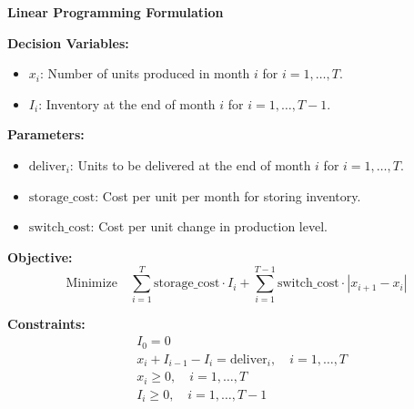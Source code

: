 \documentclass{article}
\begin{document}
\textbf{Linear Programming Formulation}

\textbf{Decision Variables:}
\begin{itemize}
    \item $x_i$: Number of units produced in month $i$ for $i = 1, \ldots, T$.
    \item $I_i$: Inventory at the end of month $i$ for $i = 1, \ldots, T-1$.
\end{itemize}

\textbf{Parameters:}
\begin{itemize}
    \item $\text{deliver}_i$: Units to be delivered at the end of month $i$ for $i = 1, \ldots, T$.
    \item $\text{storage\_cost}$: Cost per unit per month for storing inventory.
    \item $\text{switch\_cost}$: Cost per unit change in production level.
\end{itemize}

\textbf{Objective:}
\begin{equation}
\text{Minimize} \quad \sum_{i=1}^{T} \text{storage\_cost} \cdot I_i + \sum_{i=1}^{T-1} \text{switch\_cost} \cdot |x_{i+1} - x_i|
\end{equation}

\textbf{Constraints:}
\begin{align}
    & I_0 = 0 \\
    & x_i + I_{i-1} - I_i = \text{deliver}_i, \quad i = 1, \ldots, T \\
    & x_i \geq 0, \quad i = 1, \ldots, T \\
    & I_i \geq 0, \quad i = 1, \ldots, T-1
\end{align}
\end{document}
